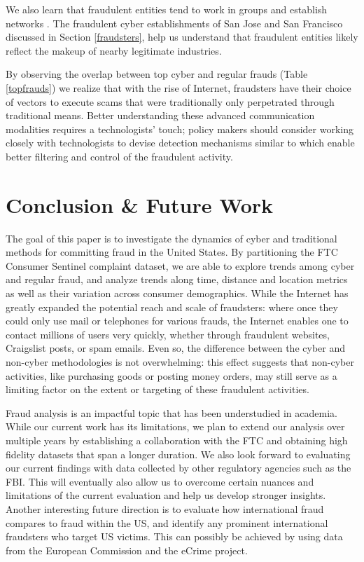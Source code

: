 \documentclass[conference]{IEEEtran}
\begin{document}
We also learn that fraudulent entities tend to work in groups and establish networks \cite{buffalodebt2}. The fraudulent cyber establishments of San Jose and San Francisco discussed in Section \ref{fraudsters}, help us understand that fraudulent entities likely reflect the makeup of nearby legitimate industries.  

By observing the overlap between top cyber and regular frauds (Table \ref{topfrauds}) we realize that with the rise of Internet, fraudsters have their choice of vectors to execute scams that were traditionally only perpetrated through traditional means. Better understanding these advanced communication modalities requires a technologists' touch;  policy makers should consider working closely with technologists to devise detection mechanisms similar to \cite{brause1999neural, moreau1997detection} which enable better filtering and control of the fraudulent activity.

\section{Conclusion \& Future Work}\label{conclusion}

The goal of this paper is to investigate the dynamics of cyber and traditional methods for committing fraud in the United States. By partitioning the FTC Consumer Sentinel complaint dataset, we are able to explore trends among cyber and regular fraud, and analyze trends along time, distance and location metrics as well as their variation across consumer demographics. While the Internet has greatly expanded the potential reach and scale of fraudsters: where once they could only use mail or telephones for various frauds, the Internet enables one to contact millions of users very quickly, whether through fraudulent websites, Craigslist posts, or spam emails. Even so, the difference between the cyber and non-cyber methodologies is not overwhelming: this effect suggests that non-cyber activities, like purchasing goods or posting money orders, may still serve as a limiting factor on the extent or targeting of these fraudulent activities. 

Fraud analysis is an impactful topic that has been understudied in academia. While our current work has its limitations, we plan to extend our analysis over multiple years by establishing a collaboration with the FTC and obtaining high fidelity datasets that span a longer duration. We also look forward to evaluating our current findings with data collected by other regulatory agencies such as the FBI. This will eventually also allow us to overcome certain nuances and limitations of the current evaluation and help us develop stronger insights. Another interesting future direction is to evaluate how international fraud compares to fraud within the US, and identify any prominent international fraudsters who target US victims. This can possibly be achieved by using data from the European Commission and the eCrime project.
\end{document}

